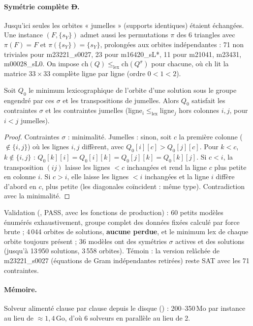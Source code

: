 \paragraph{Symétrie complète \st{D}.} Jusqu'ici seules les orbites « jumelles » (supports identiques) étaient échangées. Une instance
$(F,\{s_Y\})$ admet aussi les permutations $\pi$ des 6 triangles avec $\pi(F)=F$ et $\pi(\{s_Y\})=\{s_Y\}$, prolongées aux orbites indépendantes :
71 non triviales pour m23221\_s0027, 23 pour m16420\_sL*, 11 pour m21041, m23431, m00028\_sL0. On impose $\mathrm{ch}(Q)\le_{\mathrm{lex}}\mathrm{ch}(Q^\sigma)$
pour chacune, où $\mathrm{ch}$ lit la matrice $33\times33$ complète ligne par ligne (ordre $0<1<2$).
\begin{lemma}\label{lem:symlex}
Soit $Q_0$ le minimum lexicographique de l'orbite d'une solution sous le groupe engendré par ces $\sigma$ et les transpositions de jumelles. Alors
$Q_0$ satisfait les contraintes $\sigma$ et les contraintes jumelles (ligne$_i\le_{\mathrm{lex}}$ligne$_j$ hors colonnes $i,j$, pour $i<j$ jumelles).
\end{lemma}
\begin{proof}
Contraintes $\sigma$ : minimalité. Jumelles : sinon, soit $c$ la première colonne ($\notin\{i,j\}$) où les lignes $i,j$ diffèrent, avec $Q_0[i][c]>Q_0[j][c]$.
Pour $k<c$, $k\notin\{i,j\}$ : $Q_0[k][i]=Q_0[i][k]=Q_0[j][k]=Q_0[k][j]$. Si $c<i$, la transposition $(ij)$ laisse les lignes $<c$ inchangées
et rend la ligne $c$ plus petite en colonne $i$. Si $c>i$, elle laisse les lignes $<i$ inchangées et la ligne $i$ diffère d'abord en $c$, plus petite
(les diagonales coïncident : même type). Contradiction avec la minimalité.
\end{proof}
Validation (, PASS, avec les fonctions de production) : 60 petits modèles énumérés exhaustivement, groupe complet des données
fixées calculé par force brute ; 4\,044 orbites de solutions, \textbf{aucune perdue}, et le minimum lex de chaque orbite toujours présent ;
36 modèles ont des symétries $\sigma$ actives et des solutions (jusqu'à 13\,950 solutions, 3\,558 orbites). Témoin : la version relâchée de m23221\_s0027
(équations de Gram indépendantes retirées) reste SAT avec les 71 contraintes.

\paragraph{Mémoire.} Solveur alimenté clause par clause depuis le disque () : 200--350\,Mo par instance au lieu de
$\approx1{,}4$\,Go, d'où 6 solveurs en parallèle au lieu de 2.

